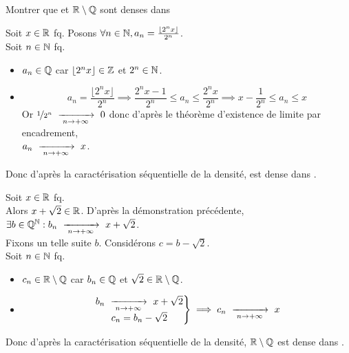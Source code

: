\documentclass{article}
\renewenvironment{question_kholle}[2][ ]
{
	\subsection{\texorpdfstring{#2}{}}
	\notblank{#1}
	{
		\noindent #1
		\bigbreak
	}
	{}
	\begin{proof}
}
{
	\end{proof}
}
\begin{document}
\begin{question_kholle}
	{Montrer que \Q et $\mathbb R\setminus\mathbb Q$ sont denses dans \R}

	Soit $x \in \mathbb R$ fq.
	Posons $\forall n \in \mathbb N, a_n = \frac{\lfloor2^n x\rfloor}{2^n}$. \\
	Soit $n \in \mathbb N$ fq. \\
	\begin{itemize}
		\item $a_n \in \mathbb Q$ car $\lfloor2^n x\rfloor \in \mathbb Z$ et $2^n \in \mathbb N$.
		\item \begin{equation*}
			      a_n = \frac{\lfloor2^n x\rfloor}{2^n}
			      \implies \frac{2^n x - 1}{2^n} \leqslant a_n \leqslant \frac{2^n x}{2^n}
			      \implies x - \frac{1}{2^n} \leqslant a_n \leqslant x
		      \end{equation*}
		      Or $\nicefrac{1}{2^n} \ \xrightarrow[\;n \to +\infty\;]{}\  0$ donc d'après le théorème d'existence de limite par encadrement, \\ $a_n \ \xrightarrow[\;n \to +\infty\;]{}\  x$.
	\end{itemize}
	Donc d'après la caractérisation séquentielle de la densité, \Q est dense dans \R.
	\bigbreak

	\noindent Soit $x \in \mathbb R$ fq. \\
	Alors $x + \sqrt{2} \in \mathbb R$.
	D'après la démonstration précédente, $\exists b \in \mathbb Q^{\mathbb N} : b_n \ \xrightarrow[\;n \to +\infty\;]{}\  x + \sqrt{2}$. \\
	Fixons un telle suite $b$.
	Considérons $c = b - \sqrt{2}$. \\
	Soit $n \in \mathbb N$ fq.
	\begin{itemize}
		\item $c_n \in \mathbb R\setminus\mathbb Q$ car $b_n \in \mathbb Q$ et $\sqrt{2} \in \mathbb R \setminus \mathbb Q$.
		\item \begin{equation*}
			      \left. \begin{matrix}
				      b_n \ \xrightarrow[\;n \to +\infty\;]{}\  x + \sqrt{2} \\
				      c_n = b_n - \sqrt{2}
			      \end{matrix} \right\}
			      \implies c_n \ \xrightarrow[\;n \to +\infty\;]{}\  x
		      \end{equation*}
	\end{itemize}
	Donc d'après la caractérisation séquentielle de la densité, $\mathbb R\setminus \mathbb Q$ est dense dans \R.
\end{question_kholle}
\end{document}
